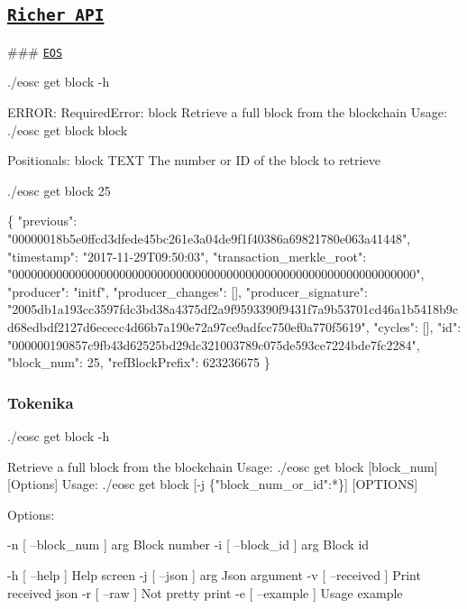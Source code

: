 \label{_richer}%
 \subsection*{\href{#toc}{\tt Richer A\+PI}}

\label{_richereos}%
 \#\#\# \href{#toc}{\tt E\+OS} 
\begin{DoxyCode}
./eosc get block -h
\end{DoxyCode}
 
\begin{DoxyCode}
ERROR: RequiredError: block
Retrieve a full block from the blockchain
Usage: ./eosc get block block

Positionals:
  block TEXT                  The number or ID of the block to retrieve
\end{DoxyCode}
 
\begin{DoxyCode}
./eosc get block 25
\end{DoxyCode}
 
\begin{DoxyCode}
\{
  "previous": "00000018b5e0ffcd3dfede45bc261e3a04de9f1f40386a69821780e063a41448",
  "timestamp": "2017-11-29T09:50:03",
  "transaction\_merkle\_root": "0000000000000000000000000000000000000000000000000000000000000000",
  "producer": "initf",
  "producer\_changes": [],
  "producer\_signature":
       "2005db1a193cc3597fdc3bd38a4375df2a9f9593390f9431f7a9b53701cd46a1b5418b9cd68edbdf2127d6ececc4d66b7a190e72a97ce9adfcc750ef0a770f5619",
  "cycles": [],
  "id": "000000190857c9fb43d62525bd29dc321003789c075de593ce7224bde7fc2284",
  "block\_num": 25,
  "refBlockPrefix": 623236675
\}
\end{DoxyCode}


\label{_richtokenika}%
 \subsubsection*{Tokenika}


\begin{DoxyCode}
./eosc get block -h
\end{DoxyCode}
 
\begin{DoxyCode}
Retrieve a full block from the blockchain
Usage: ./eosc get block [block\_num] [Options]
Usage: ./eosc get block [-j \{"block\_num\_or\_id":*\}] [OPTIONS]

Options:

  -n [ --block\_num ] arg  Block number
  -i [ --block\_id ] arg   Block id

  -h [ --help ]           Help screen
  -j [ --json ] arg       Json argument
  -v [ --received ]       Print received json
  -r [ --raw ]            Not pretty print
  -e [ --example ]        Usage example
\end{DoxyCode}
 
